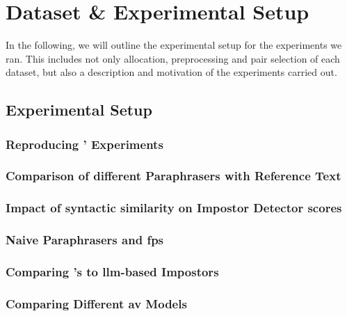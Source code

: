 \chapter{Dataset \& Experimental Setup}
\label{chap:dataset_experimental_setup}

In the following, we will outline the experimental setup for the experiments we ran.
This includes not only allocation, preprocessing and pair selection of each dataset, but also a description and motivation of the experiments carried out.




\section{Experimental Setup}
\label{sec:experimental_setup}

\subsection{Reproducing \citet{koppel_determining_2014}' Experiments}



\subsection{Comparison of different Paraphrasers with Reference Text}

\subsection{Impact of syntactic similarity on Impostor Detector scores}
\label{sec:syn_sim_impact_}

\subsection{Naive Paraphrasers and \acp{fp}}

\subsection{Comparing \citet{koppel_determining_2014}'s to \ac{llm}-based Impostors}

\subsection{Comparing Different \ac{av} Models}





